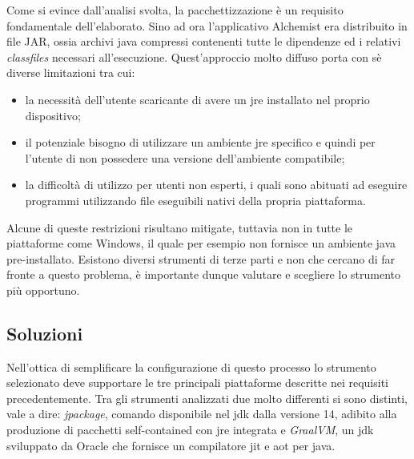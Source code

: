 Come si evince dall'analisi svolta, la pacchettizzazione è un requisito fondamentale dell'elaborato. Sino ad ora l'applicativo Alchemist era distribuito in file JAR, ossia archivi java compressi contenenti tutte le dipendenze ed i relativi \textit{classfiles} necessari all'esecuzione. Quest'approccio molto diffuso porta con sè diverse limitazioni tra cui:
\begin{itemize}
	\item la necessità dell'utente scaricante di avere un \ac{jre} installato nel proprio dispositivo;
	\item il potenziale bisogno di utilizzare un ambiente \ac{jre} specifico e quindi per l'utente di non possedere una versione dell'ambiente compatibile;
	\item la difficoltà di utilizzo per utenti non esperti, i quali sono abituati ad eseguire programmi utilizzando file eseguibili nativi della propria piattaforma.
\end{itemize}
Alcune di queste restrizioni risultano mitigate, tuttavia non in tutte le piattaforme come Windows, il quale per esempio non fornisce un ambiente java pre-installato. Esistono diversi strumenti di terze parti e non che cercano di far fronte a questo problema, è importante dunque valutare e scegliere lo strumento più opportuno.

\subsection{Soluzioni}

Nell'ottica di semplificare la configurazione di questo processo lo strumento selezionato deve supportare le tre principali piattaforme descritte nei requisiti precedentemente. Tra gli strumenti analizzati due molto differenti si sono distinti, vale a dire: \textit{jpackage}, comando disponibile nel \ac{jdk} dalla versione 14, adibito alla produzione di pacchetti self-contained con \ac{jre} integrata e \textit{GraalVM}, un \ac{jdk} sviluppato da Oracle che fornisce un compilatore \ac{jit} e \ac{aot} per java. 

